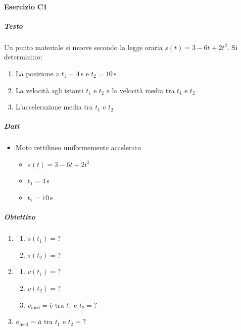 \documentclass{article}
\begin{document}
\paragraph*{Esercizio C1}
\subparagraph*{Testo}
Un punto materiale si muove secondo la legge oraria \( s(t) = 3 - 6t + 2t^2 \).
Si determinino:
\begin{enumerate}[label=\alph*)]
    \item La posizione a \( t_1 = 4\, \si{\second} \) e \( t_2 = 10\, \si{\second} \)
    \item La velocità agli istanti \( t_1 \) e \( t_2 \) e la velocità media tra \( t_1 \) e \( t_2 \)
    \item L’accelerazione media tra \( t_1 \) e \( t_2 \)
\end{enumerate}
\subparagraph*{Dati}
\begin{itemize}
    \item Moto rettilineo uniformemente accelerato
          \begin{itemize}
              \item $s(t) = 3 - 6t + 2t^2$
              \item $t_1 = 4\, \si{\second}$
              \item $t_2 = 10\, \si{\second}$
          \end{itemize}
\end{itemize}
\subparagraph*{Obiettivo}
\begin{enumerate}[label=\alph*)]
    \item \begin{enumerate}[label=\arabic*)]
              \item $s(t_1) = ?$
              \item $s(t_2) = ?$
          \end{enumerate}
    \item \begin{enumerate}[label=\arabic*)]
              \item $v(t_1) = ?$
              \item $v(t_2) = ?$
              \item $v_{\text{med}} = \overline{v} \text{ tra } t_1 \text{ e } t_2 = ?$
          \end{enumerate}
    \item $a_{\text{med}} = \overline{a} \text{ tra } t_1 \text{ e } t_2 = ?$
\end{enumerate}
\end{document}
